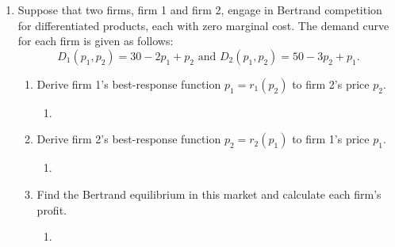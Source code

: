 \documentclass[11pt]{article}
\begin{document}
\begin{enumerate}
\begin{enumerate}
\begin{enumerate}
                \end{enumerate}
    \end{enumerate}

\item Suppose that two firms, firm 1 and firm 2, engage in Bertrand competition for differentiated products, each with zero marginal cost. The demand curve for each firm is given as follows:
	\begin{equation*}
	D_{1}(p_{1},p_{2})=30-2p_{1}+p_{2}\text{ and }D_{2}(p_{1},p_{2})=50-3p_{2}+p_{1}.
	\end{equation*}
	\begin{enumerate}
	\item Derive firm 1's best-response function $p_{1}=r_{1}(p_{2})$ to firm 2's price $p_{2}$.
    \begin{enumerate}
        \item 
    \end{enumerate}

    \item Derive firm 2's best-response function $p_{2}=r_{2}(p_{1})$ to firm 1's price $p_{1}$.
    \begin{enumerate}
        \item 
    \end{enumerate}
	\item Find the Bertrand equilibrium in this market and calculate each firm's profit.
    \begin{enumerate}
        \item 
    \end{enumerate}

	\end{enumerate}

\end{enumerate}
\end{document}
